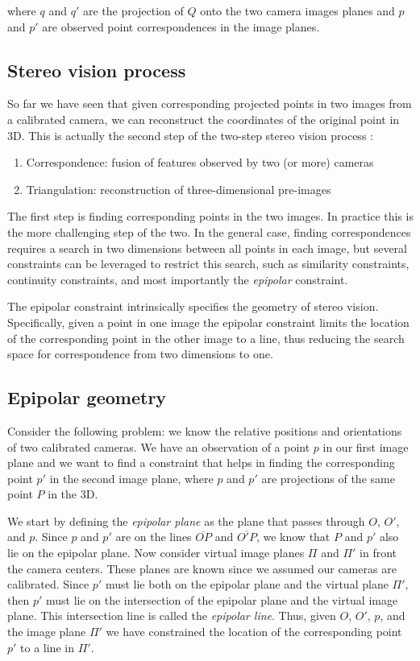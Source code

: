 \documentclass[twoside]{article}
\begin{document}
where $q$ and $q'$ are the projection of $Q$ onto the two camera images planes and $p$ and $p'$ are observed point correspondences in the image planes.

\subsection{Stereo vision process}

So far we have seen that given corresponding projected points in two images from a calibrated camera, we can reconstruct the coordinates of the original point in 3D. This is actually the second step of the two-step stereo vision process : 

\begin{enumerate}
  \item Correspondence: fusion of features observed by two (or more) cameras
  \item Triangulation: reconstruction of three-dimensional pre-images
\end{enumerate}

The first step is finding corresponding points in the two images. In practice this is the more challenging step of the two. In the general case, finding correspondences requires a search in two dimensions between all points in each image, but several constraints can be leveraged to restrict this search, such as similarity constraints, continuity constraints, and most importantly the \emph{epipolar} constraint. 

The epipolar constraint intrinsically specifies the geometry of stereo vision. Specifically, given a point in one image the epipolar constraint limits the location of the corresponding point in the other image to a line, thus reducing the search space for correspondence from two dimensions to one. 

\subsection{Epipolar geometry}

Consider the following problem: we know the relative positions and orientations of two calibrated cameras. We have an observation of a point $p$ in our first image plane and we want to find a constraint that helps in finding the corresponding point $p'$ in the second image plane, where $p$ and $p'$ are projections of the same point $P$ in the 3D.

We start by defining the \emph{epipolar plane} as the plane that passes through $O$, $O'$, and $p$. Since $p$ and $p'$ are on the lines $\overline{OP}$ and $\overline{O'P}$, we know that $P$ and $p'$ also lie on the epipolar plane. Now consider virtual image planes $\Pi$ and $\Pi'$ in front the camera centers. These planes are known since we assumed our cameras are calibrated. Since $p'$ must lie both on the epipolar plane and the virtual plane $\Pi'$, then $p'$ must lie on the intersection of the epipolar plane and the virtual image plane. This intersection line is called the \emph{epipolar line}. Thus, given $O$, $O'$, $p$, and the image plane $\Pi'$ we have constrained the location of the corresponding point $p'$ to a line in $\Pi'$. 
\end{document}
